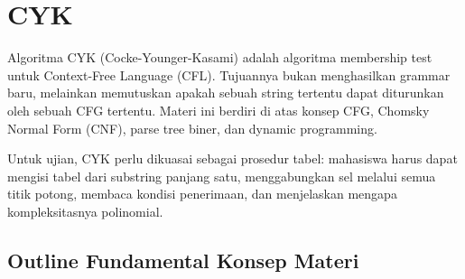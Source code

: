 \section{CYK}

Algoritma CYK (Cocke-Younger-Kasami) adalah algoritma membership test untuk Context-Free Language (CFL). Tujuannya bukan menghasilkan grammar baru, melainkan memutuskan apakah sebuah string tertentu dapat diturunkan oleh sebuah CFG tertentu. Materi ini berdiri di atas konsep CFG, Chomsky Normal Form (CNF), parse tree biner, dan dynamic programming.

Untuk ujian, CYK perlu dikuasai sebagai prosedur tabel: mahasiswa harus dapat mengisi tabel dari substring panjang satu, menggabungkan sel melalui semua titik potong, membaca kondisi penerimaan, dan menjelaskan mengapa kompleksitasnya polinomial.

\subsection{Outline Fundamental Konsep Materi}

